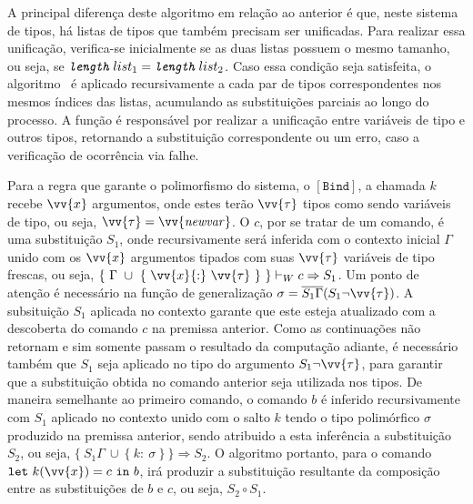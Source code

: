 A principal diferença deste algoritmo em relação ao anterior é que, neste sistema de tipos, há listas de tipos que também precisam ser unificadas.
Para realizar essa unificação, verifica-se inicialmente se as duas listas possuem o mesmo tamanho, ou seja, se $\texttt{\Length}\ list_1 = \texttt{\Length}\ list_2$.
Caso essa condição seja satisfeita, o algoritmo \Mgu\ é aplicado recursivamente a cada par de tipos correspondentes nos mesmos índices das listas, acumulando as substituições parciais ao longo do processo.
A função \texttt{\UnifyVar} é responsável por realizar a unificação entre variáveis de tipo e outros tipos, retornando a substituição correspondente ou um erro, caso a verificação de ocorrência via \texttt{\Occurs} falhe.

Para a regra que garante o polimorfismo do sistema, o $[\mathtt{Bind}]$, a chamada $k$ recebe $\vv{x}$ argumentos, onde estes terão $\vv{\tau}$ tipos como sendo variáveis de tipo, ou seja, $\vv{\tau} = \vv{\mathit{newvar}}$.
O $c$, por se tratar de um comando, é uma substituição $S_1$, onde recursivamente será inferida com o contexto inicial $\Gamma$ unido com os $\vv{x}$ argumentos tipados com suas $\vv{\tau}$ variáveis de tipo frescas, ou seja, $\{\ \Gamma\ \cup\ \{\ \vv{x}{:}\ \vv{\tau}\ \}\ \} \vdash_W c \Rightarrow S_1$.
Um ponto de atenção é necessário na função de generalização $\sigma = \overline{S_1\Gamma}(S_1 \neg\vv{\tau})$.
A subsituição $S_1$ aplicada no contexto garante que este esteja atualizado com a descoberta do comando $c$ na premissa anterior.
Como as continuações não retornam e sim somente passam o resultado da computação adiante, é necessário também que $S_1$ seja aplicado no tipo do argumento $S_1 \neg\vv{\tau}$, para garantir que a substituição obtida no comando anterior seja utilizada nos tipos.
De maneira semelhante ao primeiro comando, o comando $b$ é inferido recursivamente com $S_1$ aplicado no contexto unido com o salto $k$ tendo o tipo polimórfico $\sigma$ produzido na premissa anterior, sendo atribuido a esta inferência a substituição $S_2$, ou seja, $\{\ S_1\Gamma\ \cup\ \{\ k{:}\ \sigma \ \} \ \} \Rightarrow S_2$.
O algoritmo portanto, para o comando $\mathtt{let}\ k(\vv{x}) = c\ \mathtt{in}\ b$, irá produzir a substituição resultante da composição entre as substituições de $b$ e $c$, ou seja, $S_2 \circ S_1$.
